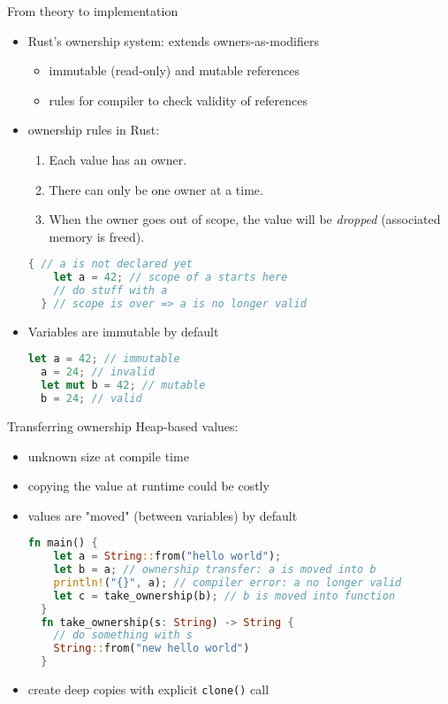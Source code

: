 \documentclass{beamer}
\begin{document}
\begin{frame}[fragile]{From theory to implementation}
\begin{itemize}
  \item Rust's ownership system: extends owners-as-modifiers
  \begin{itemize}
    \item immutable (read-only) and mutable references %
    \item rules for compiler to check validity of references
  \end{itemize}

  \pause
  \item ownership rules in Rust:
  \begin{enumerate}
    \item Each value has an owner.
    \item There can only be one owner at a time.
    \item When the owner goes out of scope, the value will be \emph{dropped} (associated memory is freed).
  \end{enumerate}
  \begin{lstlisting}[language=Rust]
  { // a is not declared yet
    let a = 42; // scope of a starts here
    // do stuff with a
  } // scope is over => a is no longer valid
  \end{lstlisting}

  \pause
  \item Variables are immutable by default
  \begin{lstlisting}[language=Rust]
  let a = 42; // immutable
  a = 24; // invalid
  let mut b = 42; // mutable
  b = 24; // valid
  \end{lstlisting}
\end{itemize}
\end{frame}





\begin{frame}[fragile]{Transferring ownership}
Heap-based values: 
\begin{itemize}
  \item unknown size at compile time
  \item copying the value at runtime could be costly
  \item values are "moved" (between variables) by default

  \begin{lstlisting}[language=Rust]
  fn main() {
    let a = String::from("hello world");
    let b = a; // ownership transfer: a is moved into b
    println!("{}", a); // compiler error: a no longer valid
    let c = take_ownership(b); // b is moved into function
  }
  fn take_ownership(s: String) -> String {
    // do something with s
    String::from("new hello world")
  }
  \end{lstlisting}
  \item create deep copies with explicit \verb|clone()| call
\end{itemize}
\end{frame}
\end{document}
